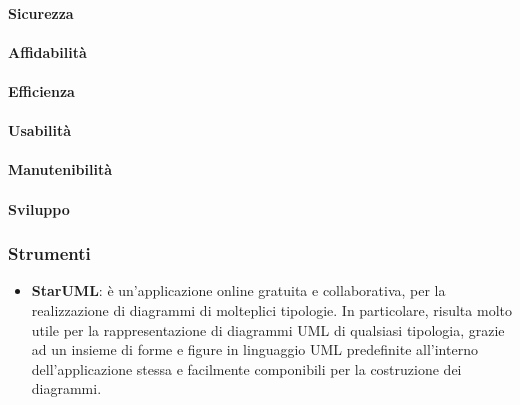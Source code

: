 			\paragraph{Sicurezza}
			\paragraph{Affidabilità}
			\paragraph{Efficienza}
			\paragraph{Usabilità}
			\paragraph{Manutenibilità}
			\paragraph{Sviluppo}
\fi
	
		\subsubsection{Strumenti}
			\begin{itemize}
				\item\textbf{StarUML}: è un'applicazione online gratuita e collaborativa, per la realizzazione di diagrammi di molteplici tipologie. In particolare, risulta molto utile per la rappresentazione di diagrammi UML di qualsiasi tipologia, grazie ad un insieme di forme e figure in linguaggio UML predefinite all'interno dell'applicazione stessa e facilmente componibili per la costruzione dei diagrammi.
			\end{itemize}
			
			
			
			
			
			
			
			
			
			
			
			
			
			
			
\newpage		
				